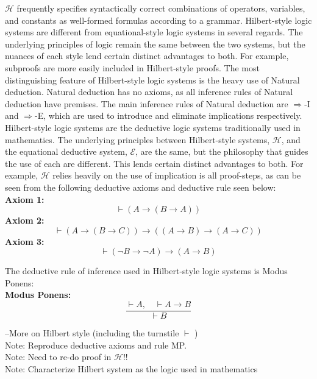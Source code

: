 \documentclass[fleqn, leqno]{article}
\begin{document}
$\mathcal{H}$ frequently specifies syntactically correct combinations of operators, variables, and constants as well-formed formulas
according to a grammar.
Hilbert-style logic systems are different from equational-style logic systems in several regards.  The underlying principles of logic remain the same between the two systems, but the nuances of each style lend certain distinct advantages to both.  For example, subproofs are more easily included in Hilbert-style proofs.  The most distinguishing feature of Hilbert-style logic systems is the heavy use of Natural deduction.  Natural deduction has no axioms, as all inference rules of Natural deduction have premises.  The main inference rules of Natural deduction are $\Rightarrow$-I and $\Rightarrow$-E, which are used to introduce and eliminate implications respectively.\\

Hilbert-style logic systems are the deductive logic systems traditionally used in mathematics.  The underlying principles between Hilbert-style systems, $\mathcal{H}$, and the equational deductive system, $\mathcal{E}$, are the same, but the philosophy that guides the use of each are different.  This lends certain distinct advantages to both.  For example, $\mathcal{H}$ relies heavily on the use of implication is all proof-steps, as can be seen from the following deductive axioms and deductive rule seen below:\\

\textbf{Axiom 1:}
\[
\vdash (A \rightarrow (B \rightarrow A))
\]
\textbf{Axiom 2:}
\[
\vdash (A \rightarrow (B \rightarrow C)) \rightarrow ((A \rightarrow B) \rightarrow (A \rightarrow C))
\]
\textbf{Axiom 3:}
\[
\vdash (\lnot B \rightarrow \lnot A) \rightarrow (A \rightarrow B)
\]

The deductive rule of inference used in Hilbert-style logic systems is Modus Ponens:\\

\textbf{Modus Ponens:}
\[
\frac{\vdash A, \quad \vdash A \rightarrow B}{\vdash B}
\]

--More on Hilbert style (including the turnstile $\vdash$ )\\

Note: Reproduce deductive axioms and rule MP.\\

Note: Need to re-do proof in $\mathcal{H}$!!\\

Note: Characterize Hilbert system as the logic used in mathematics\\
\end{document}
